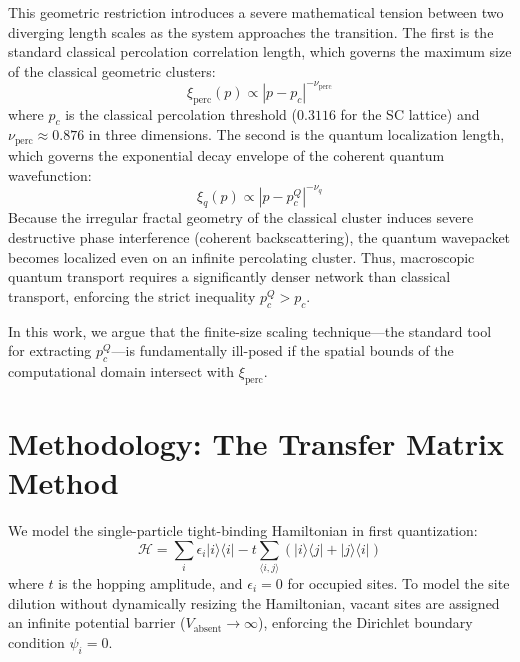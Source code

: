\documentclass[11pt,a4paper]{article}
\begin{document}
This geometric restriction introduces a severe mathematical tension between two diverging length scales as the system approaches the transition. The first is the standard classical percolation correlation length, which governs the maximum size of the classical geometric clusters:
\begin{equation}
\xi_{\text{perc}}(p) \propto |p - p_c|^{-\nu_{\text{perc}}}
\end{equation}
where $p_c$ is the classical percolation threshold ($0.3116$ for the SC lattice) and $\nu_{\text{perc}} \approx 0.876$ in three dimensions. The second is the quantum localization length, which governs the exponential decay envelope of the coherent quantum wavefunction:
\begin{equation}
\xi_q(p) \propto |p - p_c^Q|^{-\nu_q}
\end{equation}
Because the irregular fractal geometry of the classical cluster induces severe destructive phase interference (coherent backscattering), the quantum wavepacket becomes localized even on an infinite percolating cluster. Thus, macroscopic quantum transport requires a significantly denser network than classical transport, enforcing the strict inequality $p_c^Q > p_c$. 

In this work, we argue that the finite-size scaling technique—the standard tool for extracting $p_c^Q$—is fundamentally ill-posed if the spatial bounds of the computational domain intersect with $\xi_{\text{perc}}$. 

\section{Methodology: The Transfer Matrix Method}

We model the single-particle tight-binding Hamiltonian in first quantization:
\begin{equation}
\mathcal{H} = \sum_{i} \epsilon_i |i\rangle\langle i| - t \sum_{\langle i,j \rangle} \left( |i\rangle\langle j| + |j\rangle\langle i| \right)
\end{equation}
where $t$ is the hopping amplitude, and $\epsilon_i = 0$ for occupied sites. To model the site dilution without dynamically resizing the Hamiltonian, vacant sites are assigned an infinite potential barrier ($V_{\text{absent}} \to \infty$), enforcing the Dirichlet boundary condition $\psi_i = 0$.
\end{document}
